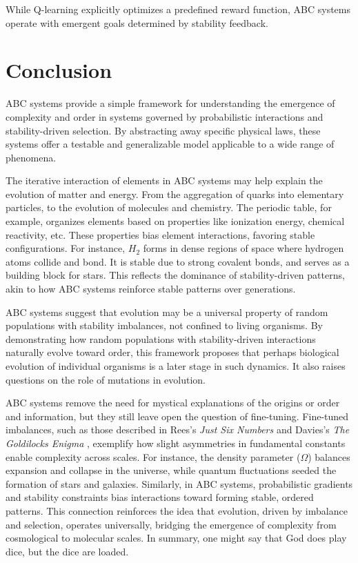 \documentclass[entropy,article,submit,pdftex,moreauthors]{Definitions/mdpi}
\begin{document}
While Q-learning explicitly optimizes a predefined reward function, ABC systems operate with emergent goals determined by stability feedback. 

\section{Conclusion}

ABC systems provide a simple framework for understanding the emergence of complexity and order in systems governed by probabilistic interactions and stability-driven selection. By abstracting away specific physical laws, these systems offer a testable and generalizable model applicable to a wide range of phenomena. 

The iterative interaction of elements in ABC systems may help explain the evolution of matter and energy. From the aggregation of quarks into elementary particles, to the evolution of molecules and chemistry. The periodic table, for example, organizes elements based on properties like ionization energy, chemical reactivity, etc. These properties bias element interactions, favoring stable configurations. For instance, \( H_2 \) forms in dense regions of space where hydrogen atoms collide and bond. It is stable due to strong covalent bonds, and serves as a building block for stars. This reflects the dominance of stability-driven patterns, akin to how ABC systems reinforce stable patterns over generations. 

ABC systems suggest that evolution may be a universal property of random populations with stability imbalances, not confined to living organisms. By demonstrating how random populations with stability-driven interactions naturally evolve toward order, this framework proposes that perhaps biological evolution of individual organisms is a later stage in such dynamics. It also raises questions on the role of mutations in evolution.

ABC systems remove the need for mystical explanations of the origins or order and information, but they still leave open the question of fine-tuning. Fine-tuned imbalances, such as those described in Rees's \textit{Just Six Numbers} \cite{rees2000just} and Davies's \textit{The Goldilocks Enigma} \cite{davies2006goldilocks}, exemplify how slight asymmetries in fundamental constants enable complexity across scales. For instance, the density parameter (\(\Omega\)) balances expansion and collapse in the universe, while quantum fluctuations seeded the formation of stars and galaxies. Similarly, in ABC systems, probabilistic gradients and stability constraints bias interactions toward forming stable, ordered patterns. This connection reinforces the idea that evolution, driven by imbalance and selection, operates universally, bridging the emergence of complexity from cosmological to molecular scales. In summary, one might say that God does play dice, but the dice are loaded.
\end{document}
